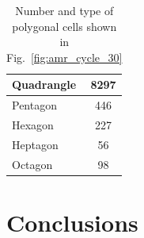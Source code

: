 \documentclass[preprint,10pt]{elsarticle}
\newcommand{\fig}[1]{Fig.~\ref{#1}}                      %
\begin{document}

\begin{table}[!htbp]
	\centering
		\begin{tabular}{|l||c|}
		\hline
Quadrangle&  8297  \\ \hline
Pentagon  &  446  \\ \hline
Hexagon   &  227  \\ \hline
Heptagon  &  56  \\ \hline
Octagon   &  98  \\ \hline
   \end{tabular}
	\caption{Number and type of polygonal cells shown in \fig{fig:amr_cycle_30}}
	\label{tab:poly_cell_types_amr_poly}
\end{table}

\section{Conclusions} \label{sec:ccl}


\pagebreak





\end{document}
